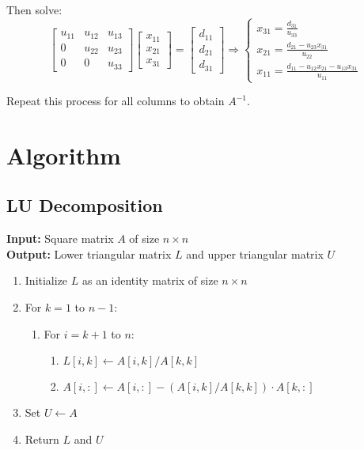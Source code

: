 \documentclass[a4paper,12pt]{article}
\begin{document}
Then solve:
\[
\begin{bmatrix}
	u_{11} & u_{12} & u_{13} \\
	0 & u_{22} & u_{23} \\
	0 & 0 & u_{33}
\end{bmatrix}
\begin{bmatrix}
	x_{11} \\ x_{21} \\ x_{31}
\end{bmatrix}
=
\begin{bmatrix}
	d_{11} \\ d_{21} \\ d_{31}
\end{bmatrix}
\Rightarrow
\left\{
\begin{array}{l}
	x_{31} = \frac{d_{31}}{u_{33}} \\
	x_{21} = \frac{d_{21} - u_{23} x_{31}}{u_{22}} \\
	x_{11} = \frac{d_{11} - u_{12} x_{21} - u_{13} x_{31}}{u_{11}}
\end{array}
\right.
\]

Repeat this process for all columns to obtain \( A^{-1} \).

\section{Algorithm}

\subsection{LU Decomposition}
\textbf{Input:} Square matrix $A$ of size $n \times n$ \\
\textbf{Output:} Lower triangular matrix $L$ and upper triangular matrix $U$
\begin{enumerate}
	\item Initialize $L$ as an identity matrix of size $n \times n$
	\item For $k = 1$ to $n - 1$:
	\begin{enumerate}
		\item For $i = k + 1$ to $n$:
		\begin{enumerate}
			\item $L[i,k] \leftarrow A[i,k] / A[k,k]$
			\item $A[i,:] \leftarrow A[i,:] - (A[i,k]/A[k,k]) \cdot A[k,:]$
		\end{enumerate}
	\end{enumerate}
	\item Set $U \leftarrow A$
	\item Return $L$ and $U$
\end{enumerate}
\end{document}
